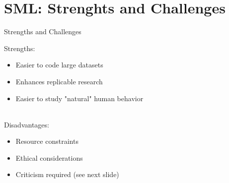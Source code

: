 \documentclass[handout]{beamer}
\begin{document}
\section{SML: Strenghts and Challenges}


\begin{frame}{Strengths and Challenges} 
	
	Strengths:
	\begin{itemize}
		\item Easier to code large datasets
		\item Enhances replicable research
		\item Easier to study "natural" human behavior \\\
	\end{itemize}
	
	Disadvantages:
	\begin{itemize}
		\item Resource constraints
		\item Ethical considerations
		\item Criticism required (see next slide)
	\end{itemize}



\end{frame}
\end{document}
